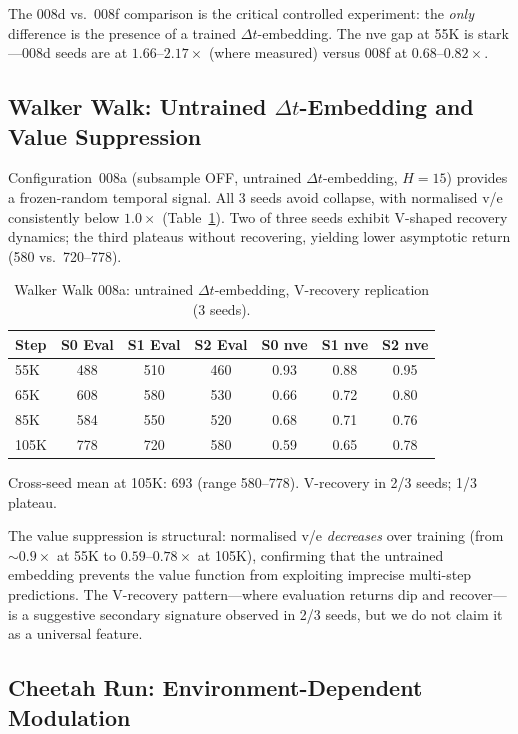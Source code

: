 \documentclass[letterpaper]{article}
\begin{document}
The 008d vs.\ 008f comparison is the critical controlled experiment: the \emph{only} difference is the presence of a trained $\Delta t$-embedding.
The nve gap at 55K is stark---008d seeds are at $1.66$--$2.17\times$ (where measured) versus 008f at $0.68$--$0.82\times$.

\subsection{Walker Walk: Untrained $\Delta t$-Embedding and Value Suppression}
\label{sec:walker-008a}

Configuration~008a (subsample OFF, untrained $\Delta t$-embedding, $H{=}15$) provides a frozen-random temporal signal.
All 3 seeds avoid collapse, with normalised v/e consistently below $1.0\times$ (Table~\ref{tab:walker-008a}).
Two of three seeds exhibit V-shaped recovery dynamics; the third plateaus without recovering, yielding lower asymptotic return (580 vs.\ 720--778).

\begin{table}[h]
\centering
\caption{Walker Walk 008a: untrained $\Delta t$-embedding, V-recovery replication (3 seeds).}
\label{tab:walker-008a}
\begin{tabular}{lcccccc}
\toprule
Step & S0 Eval & S1 Eval & S2 Eval & S0 nve & S1 nve & S2 nve \\
\midrule
55K  & 488 & 510 & 460 & 0.93 & 0.88 & 0.95 \\
65K  & 608 & 580 & 530 & 0.66 & 0.72 & 0.80 \\
85K  & 584 & 550 & 520 & 0.68 & 0.71 & 0.76 \\
105K & 778 & 720 & 580 & 0.59 & 0.65 & 0.78 \\
\bottomrule
\end{tabular}
\vspace{0.5em}

Cross-seed mean at 105K: 693 (range 580--778). V-recovery in 2/3 seeds; 1/3 plateau.
\end{table}

The value suppression is structural: normalised v/e \emph{decreases} over training (from ${\sim}0.9\times$ at 55K to $0.59$--$0.78\times$ at 105K), confirming that the untrained embedding prevents the value function from exploiting imprecise multi-step predictions.
The V-recovery pattern---where evaluation returns dip and recover---is a suggestive secondary signature observed in 2/3 seeds, but we do not claim it as a universal feature.

\subsection{Cheetah Run: Environment-Dependent Modulation}
\label{sec:cheetah}
\end{document}
